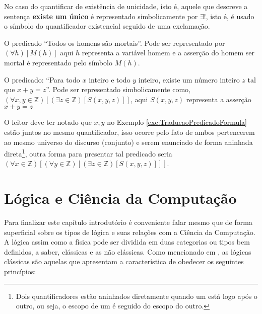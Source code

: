 \begin{remark}
	No caso do quantificar de existência de unicidade, isto é, aquele que descreve a sentença \textbf{existe um único} é representado simbolicamente por $\exists!$, isto é, é usado o símbolo do quantificador existencial seguido de uma exclamação.
\end{remark}


\begin{example}
	O predicado ``Todos os homens são mortais''. Pode ser representado por $(\forall h)[M(h)]$ aqui $h$ representa a variável homem e a asserção do homem ser mortal é representado pelo símbolo $M(h)$.
\end{example}

\begin{example}\label{exe:TraducaoPredicadoFormula}
	O predicado: ``Para todo $x$ inteiro e todo $y$ inteiro, existe um número inteiro $z$ tal que $x + y = z$''. Pode ser representado simbolicamente como, $(\forall x, y \in \mathbb{Z})[(\exists z \in \mathbb{Z})[S(x,y,z)]]$, aqui $S(x,y,z)$ representa a asserção $x + y = z$
\end{example}



O leitor deve ter notado que $x, y$ no Exemplo \ref{exe:TraducaoPredicadoFormula} estão juntos no mesmo quantificador, isso ocorre pelo fato de ambos pertencerem ao mesmo universo do discurso (conjunto) e serem enunciado de forma aninhada direta\footnote{Dois quantificadores estão aninhados diretamente quando um está logo após o outro, ou seja, o escopo de um é seguido do escopo do outro.}, outra forma para presentar tal predicado seria $(\forall x \in \mathbb{Z})[(\forall y \in \mathbb{Z})[(\exists z \in \mathbb{Z})[S(x,y,z)]]]$.



\section{Lógica e Ciência da Computação}\label{sec:Tipos-Logica-Aplicacoes}


Para finalizar este capítulo introdutório é conveniente falar mesmo que de forma superficial sobre os tipos de lógica e suas relações com a Ciência da Computação. A lógica assim como a física pode ser dividida em duas categorias ou tipos bem definidos, a saber, clássicas e as não
clássicas. Como mencionado em  \cite{BenjaV1, edgar2002}, as lógicas clássicas são aquelas que apresentam a característica de obedecer os seguintes princípios: 

